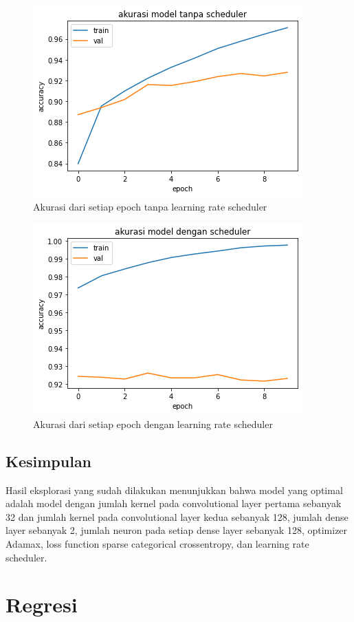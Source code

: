 \documentclass[a4, 12px]{article}
\theoremstyle{definition}
\theoremstyle{remark}
\begin{document}
\begin{figure}[!h]
	\centering
	\includegraphics[width=0.7\linewidth]{src/K8.png}
	\caption{Akurasi dari setiap epoch tanpa learning rate scheduler}
	\label{fig:k8}
\end{figure}
\begin{figure}[!h]
	\centering
	\includegraphics[width=0.7\linewidth]{src/K9.png}
	\caption{Akurasi dari setiap epoch dengan learning rate scheduler}
	\label{fig:k9}
\end{figure}

\subsection{Kesimpulan}
Hasil eksplorasi yang sudah dilakukan menunjukkan bahwa model yang optimal adalah model dengan jumlah kernel pada convolutional layer pertama sebanyak 32 dan jumlah kernel pada convolutional layer kedua sebanyak 128, jumlah dense layer sebanyak 2, jumlah neuron pada setiap dense layer sebanyak 128, optimizer Adamax, loss function sparse categorical crossentropy, dan learning rate scheduler.

\section{Regresi}\label{sec:regresi}
\end{document}
